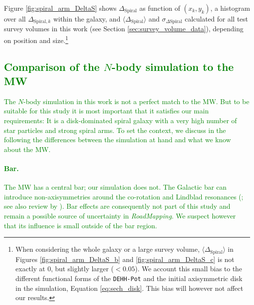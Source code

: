 \documentclass[iop,revtex4,numberedappendix,appendixfloats]{emulateapj}
\newcommand{\RM}{{\sl RoadMapping}}
\newcommand{\NEW}[1]{\textcolor{Green}{#1}}
\begin{document}
Figure \ref{fig:spiral_arm_DeltaS} shows $\Delta_\text{Spiral}$ as function of $(x_k,y_k)$, a histogram over all $\Delta_{\text{Spiral},k}$ within the galaxy, and $\langle \Delta_\text{Spiral} \rangle$ and $\sigma_{\Delta\text{Spiral}}$ calculated for all test survey volumes in this work (see Section \ref{sec:survey_volume_data}), depending on position and size.\footnote{When considering the whole galaxy or a large survey volume, $\langle \Delta_\text{Spiral} \rangle$ in Figures \ref{fig:spiral_arm_DeltaS_b} and \ref{fig:spiral_arm_DeltaS_c} is not exactly at $0$, but slightly larger ($<0.05$). We account this small bias to the different functional forms of the \texttt{DEHH-Pot} and the initial axisymmetric disk in the simulation, Equation \eqref{eq:sech_disk}. This bias will however not affect our results.}

\subsection{\NEW{Comparison of the $N$-body simulation to the MW}} \label{sec:comparison_with_MW}

\NEW{The $N$-body simulation in this work is not a perfect match to the MW. But to be suitable for this study it is most important that it satisfies our main requirements:  It is a disk-dominated spiral galaxy with a very high number of star particles and strong spiral arms. To set the context, we discuss in the following the differences between the simulation at hand and what we know about the MW.}

\NEW{\paragraph{Bar.} The MW has a central bar; our simulation does not. The Galactic bar can introduce non-axisymmetries around the co-rotation and Lindblad resonances (\citealt{2000AJ....119..800D,2001A&A...373..511F,2003AJ....125..785Q,2005AJ....130..576Q,2010MNRAS.409..145S,2010ApJ...722..112M,2017MNRAS.466L.113M}; see also review by \citealt{2011MSAIS..18..185G}). Bar effects are consequently not part of this study and remain a possible source of uncertainty  in \RM{}. We suspect however that its influence is small outside of the bar region.}
\end{document}
